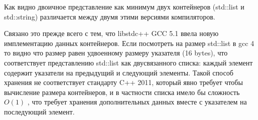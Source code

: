 \documentclass[14pt,a4paper]{article}
\begin{document}
Как видно двоичное представление как минимум двух контейнеров
(std::list и std::string) различается между двумя этими версиями
компиляторов.

Связано это прежде всего с тем, что libstdc++ GCC 5.1 ввела
\cite{DualABI}  новую имплементацию данных контейнеров. Если
посмотреть на размер std::list в gcc 4 то видно что размер равен
удвоенному размеру
указателя (16 bytes), что соответствует представлению std::list как
двусвязанного списка: каждый элемент содержит указатели на предыдущий
и следующий элементы. Такой способ хранения не соответствует стандарту
C++ 2011, который явно требует чтобы вычисление размера контейнеров, и
в частности списка имело бы сложность $O(1)$ \cite{cpp11}, что требует хранения
дополнительных данных вместе с указателем на последующий элемент.  






\end{document}
